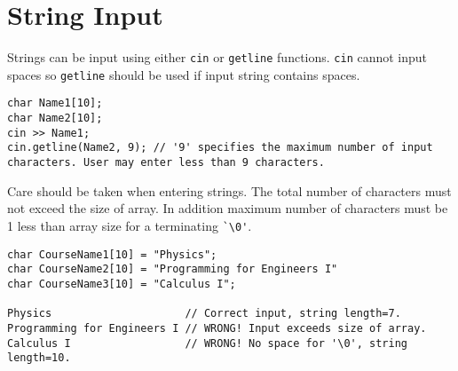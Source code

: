 \documentclass[12pt,a4paper]{article}
\begin{document}
\section{String Input}
Strings can be input using either \texttt{cin} or \texttt{getline} functions. \texttt{cin} cannot input spaces so \texttt{getline} should be used if input string contains spaces.
\begin{lstlisting}[caption={String Input}]
char Name1[10];
char Name2[10];
cin >> Name1;
cin.getline(Name2, 9); // '9' specifies the maximum number of input characters. User may enter less than 9 characters.
\end{lstlisting}

Care should be taken when entering strings. The total number of characters must not exceed the size of array. In addition maximum number of characters must be 1 less than array size for a terminating \verb|`\0'|.
\begin{lstlisting}
char CourseName1[10] = "Physics";
char CourseName2[10] = "Programming for Engineers I"
char CourseName3[10] = "Calculus I";

Physics                     // Correct input, string length=7.
Programming for Engineers I // WRONG! Input exceeds size of array.
Calculus I                  // WRONG! No space for '\0', string length=10.
\end{lstlisting}
\end{document}

